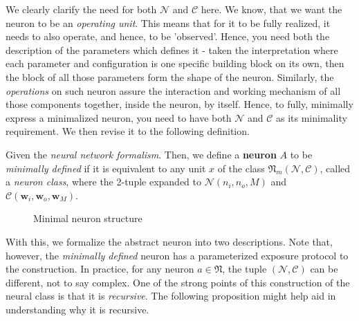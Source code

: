 We clearly clarify the need for both $\mathcal{N}$ and $\mathcal{C}$ here. We know, that we want the neuron to be an \textit{operating unit}. This means that for it to be fully realized, it needs to also operate, and hence, to be 'observed'. Hence, you need both the description of the parameters which defines it - taken the interpretation where each parameter and configuration is one specific building block on its own, then the block of all those parameters form the shape of the neuron. Similarly, the \textit{operations} on such neuron assure the interaction and working mechanism of all those components together, inside the neuron, by itself. Hence, to fully, minimally express a minimalized neuron, you need to have both $\mathcal{N}$  and $\mathcal{C}$ as its minimality requirement. We then revise it to the following definition. 

\begin{definition} \label{def:neuclass}
    Given the \textit{neural network formalism}. Then, we define a \textbf{neuron} $A$ to be \textit{minimally defined} if it is equivalent to any unit $x$ of the class $\mathfrak{N}_{m}(\mathcal{N}, \mathcal{C})$, called a \textit{neuron class}, where the 2-tuple expanded to $\mathcal{N}(n_{i}, n_{o}, M)$ and $\mathcal{C}(\mathbf{w}_{i}, \mathbf{w}_{o}, \mathbf{w}_{M})$. %
\end{definition}

\begin{figure}[!ht]
    \centering
    \caption{Minimal neuron structure}
    \label{fig:lable}
\end{figure}

With this, we formalize the abstract neuron into two descriptions. Note that, however, the \textit{minimally defined} neuron has a parameterized exposure protocol to the construction. In practice, for any neuron $a \in \mathfrak{N}$, the tuple $(\mathcal{N}, \mathcal{C})$ can be different, not to say complex. One of the strong points of this construction of the neural class is that it is \textit{recursive}. The following proposition might help aid in understanding why it is recursive.

